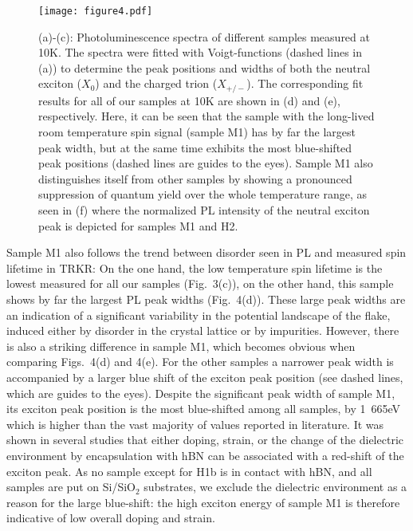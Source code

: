 \documentclass[prb,aps,superscriptaddress,reprint]{revtex4-1}
\begin{document}
\begin{figure*}[tb]
		\texttt{[image: figure4.pdf]}
	\caption{(a)-(c): Photoluminescence spectra of different samples measured at \unit{10}{K}. The spectra were fitted with Voigt-functions (dashed lines in (a)) to determine the peak positions and widths of both the neutral exciton ($X_0$) and the charged trion ($X_{+/-}$). The corresponding fit results for all of our samples at \unit{10}{K} are shown in (d) and (e), respectively. Here, it can be seen that the sample with the long-lived room temperature spin signal (sample M1) has by far the largest peak width, but at the same time exhibits the most blue-shifted peak positions (dashed lines are guides to the eyes). Sample M1 also distinguishes itself from other samples by showing a pronounced suppression of quantum yield over the whole temperature range, as seen in (f) where the normalized PL intensity of the neutral exciton peak is depicted for samples M1 and H2.}
	\label{figure4}
\end{figure*}

Sample M1 also follows the trend between disorder seen in PL and measured spin lifetime in TRKR: On the one hand, the low temperature spin lifetime is the lowest measured for all our samples (Fig.~3(c)), on the other hand, this sample shows by far the largest PL peak widths (Fig.~4(d)). These large peak widths are an indication of a significant variability in the potential landscape of the flake, induced either by disorder in the crystal lattice or by impurities.\cite{NatureComm.6.8315,2DMaterials.4.031011,PhysRevX.7.021026,arXiv180500127} However, there is also a striking difference in sample M1, which becomes obvious when comparing Figs.~4(d) and 4(e). For the other samples a narrower peak width is accompanied by a larger blue shift of the exciton peak position (see dashed lines, which are guides to the eyes). Despite the significant peak width of sample M1, its exciton peak position is the most blue-shifted among all samples, by \unit{1.665}{eV} which is higher than the vast majority of values reported in literature.\cite{Supplement} It was shown in several studies that either doping,\cite{NatureNanotechnology.12.856,NaturePhysics.13.255,NatNano.8.634} strain,\cite{Nanoscale.8.2589,PRB.88.121301,NanoLetters.13.3626} or the change of the dielectric environment by encapsulation with hBN\cite{ScientificReports.7.12383, 2DMaterials.4.031011,Supplement} can be associated with a red-shift of the exciton peak. As no sample except for H1b is in contact with hBN, and all samples are put on Si/SiO$_2$ substrates, we exclude the dielectric environment as a reason for the large blue-shift: the high exciton energy of sample M1 is therefore indicative of low overall doping and strain.
\end{document}
